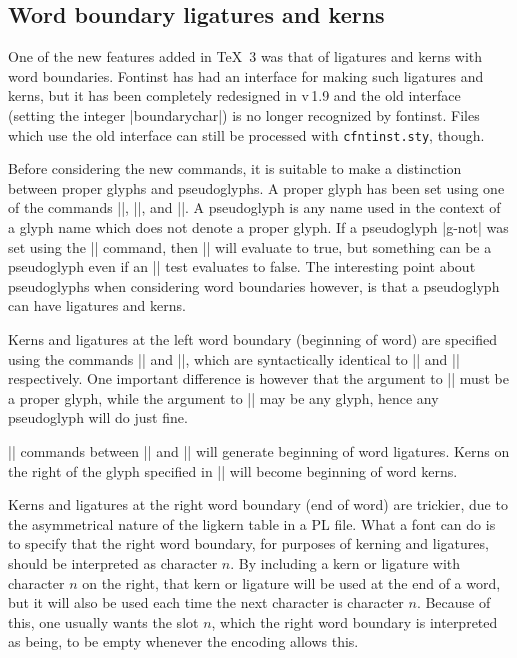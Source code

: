 \documentclass[a4paper]{ltxguide}
\newcommand*{\setpackagename}[1]{\textsf{#1}}
\newcommand{\fontinst}{\setpackagename{font\-inst}\xspace}
\newcommand{\Fontinst}{\setpackagename{Font\-inst}\xspace}
\begin{document}


\subsection{Word boundary ligatures and kerns}

One of the new features added in \TeX~3 was that of ligatures and 
kerns with word boundaries. \Fontinst has had an interface 
for making such ligatures and kerns, but it has been completely 
redesigned in v\,1.9 and the old interface (setting the integer 
|boundarychar|) is no longer recognized by \fontinst. Files 
which use the old interface can still be processed with 
\texttt{cfntinst.sty}, though.

Before considering the new commands, it is suitable to make a 
distinction between proper glyphs and pseudoglyphs. A proper glyph has 
been set using one of the commands |\setrawglyph|, |\setglyph|, and 
|\resetglyph|. A pseudoglyph is any name used in the context of a 
glyph name which does not denote a proper glyph. If a pseudoglyph 
|g-not| was set using the |\setnotglyph| command, then 
|\then| will evaluate to true, but something can be 
a pseudoglyph even if an |\ifisglyph| test evaluates to false. The 
interesting point about pseudoglyphs when considering word boundaries 
however, is that a pseudoglyph can have ligatures and kerns.

Kerns and ligatures at the left word boundary (beginning of word) are 
specified using the commands |\setleftboundary| and 
|\endsetleftboundary|, which are syntactically identical to 
|\setslot| and |\endsetslot| respectively. One important difference is 
however that the argument to |\setslot| must be a proper glyph, while 
the argument to |\setleftboundary| may be any glyph, hence any 
pseudoglyph will do just fine.

|\ligature| commands between |\setleftboundary| and 
|\endsetleftboundary| will generate beginning of word ligatures. Kerns 
on the right of the glyph specified in |\setleftboundary| will become 
beginning of word kerns.

Kerns and ligatures at the right word boundary (end of word) are 
trickier, due to the asymmetrical nature of the ligkern table in a PL 
file. What a font can do is to specify that the right word boundary, 
for purposes of kerning and ligatures, should be interpreted as 
character $n$. By including a kern or ligature with character $n$ on 
the right, that kern or ligature will be used at the end of a word, 
but it will also be used each time the next character is character 
$n$. Because of this, one usually wants the slot $n$, which the right 
word boundary is interpreted as being, to be empty whenever the 
encoding allows this.
\end{document}
